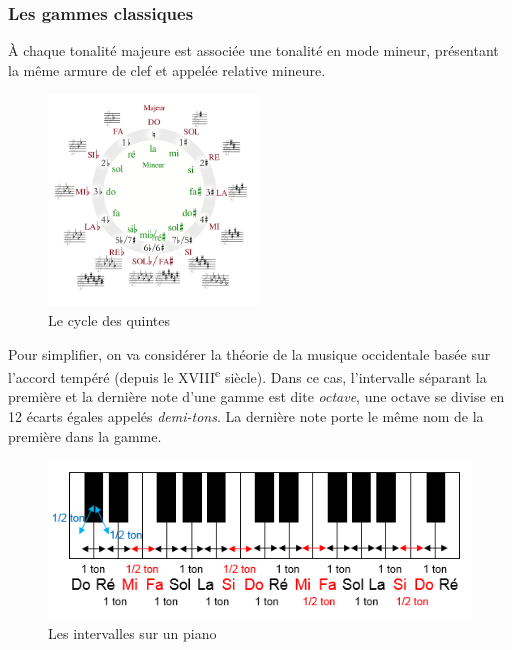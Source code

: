 \documentclass[]{article}
\begin{document}
\hypertarget{les-gammes-classiques}{%
\subsubsection{Les gammes classiques}\label{les-gammes-classiques}}

À chaque tonalité majeure est associée une tonalité en mode mineur,
présentant la même armure de clef et appelée relative mineure.

\begin{figure}
\centering
\includegraphics[width=0.5\textwidth,height=\textheight]{img/cycle-des-quintes.png}
\caption{Le cycle des quintes}
\end{figure}

Pour simplifier, on va considérer la théorie de la musique occidentale
basée sur l'accord tempéré (depuis le XVIII\textsuperscript{e} siècle).
Dans ce cas, l'intervalle séparant la première et la dernière note d'une
gamme est dite \emph{octave}, une octave se divise en 12 écarts égales
appelés \emph{demi-tons}. La dernière note porte le même nom de la
première dans la gamme.

\begin{figure}
\centering
\includegraphics[width=1\textwidth,height=\textheight]{img/intervalles-piano.png}
\caption{Les intervalles sur un piano}
\end{figure}
\end{document}
